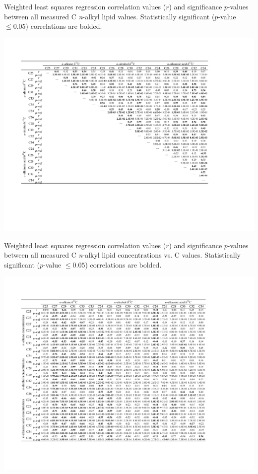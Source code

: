 \begin{table}
	\caption[C  correlation $r$ and $p$-values]{Weighted least squares regression correlation values ($r$) and significance $p$-values between all measured C \textit{n}-alkyl lipid  values. Statistically significant ($p$-value $\leq  0.05$) correlations are bolded.}
	\centering
		\includegraphics{Thesis_Tables/Ch4Tab2}
	\label{Ch4Tab:2} 
\end{table}

\begin{table}
	\caption[C concentration vs.  correlation $r$ and $p$-values]{Weighted least squares regression correlation values ($r$) and significance $p$-values between all measured C \textit{n}-alkyl lipid concentrations vs. C  values. Statistically significant ($p$-value $\leq  0.05$) correlations are bolded.}
	\centering
		\includegraphics{Thesis_Tables/Ch4Tab3}
	\label{Ch4Tab:3} 
\end{table}

